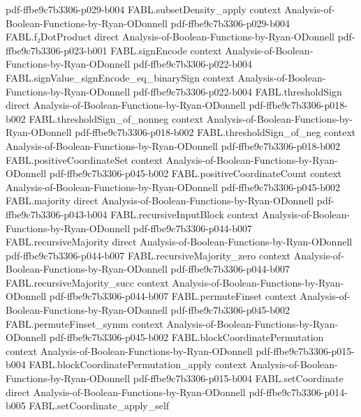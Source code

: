 \begin{theorem}
  {pdf-ffbe9c7b3306-p029-b004}
\proofstep
  {FABL.subsetDensity_apply}
  {context}
  {Analysis-of-Boolean-Functions-by-Ryan-ODonnell}
  {pdf-ffbe9c7b3306-p029-b004}
\proofstep
  {FABL.f₂DotProduct}
  {direct}
  {Analysis-of-Boolean-Functions-by-Ryan-ODonnell}
  {pdf-ffbe9c7b3306-p023-b001}
\proofstep
  {FABL.signEncode}
  {context}
  {Analysis-of-Boolean-Functions-by-Ryan-ODonnell}
  {pdf-ffbe9c7b3306-p022-b004}
\proofstep
  {FABL.signValue_signEncode_eq_binarySign}
  {context}
  {Analysis-of-Boolean-Functions-by-Ryan-ODonnell}
  {pdf-ffbe9c7b3306-p022-b004}
\proofstep
  {FABL.thresholdSign}
  {direct}
  {Analysis-of-Boolean-Functions-by-Ryan-ODonnell}
  {pdf-ffbe9c7b3306-p018-b002}
\proofstep
  {FABL.thresholdSign_of_nonneg}
  {context}
  {Analysis-of-Boolean-Functions-by-Ryan-ODonnell}
  {pdf-ffbe9c7b3306-p018-b002}
\proofstep
  {FABL.thresholdSign_of_neg}
  {context}
  {Analysis-of-Boolean-Functions-by-Ryan-ODonnell}
  {pdf-ffbe9c7b3306-p018-b002}
\proofstep
  {FABL.positiveCoordinateSet}
  {context}
  {Analysis-of-Boolean-Functions-by-Ryan-ODonnell}
  {pdf-ffbe9c7b3306-p045-b002}
\proofstep
  {FABL.positiveCoordinateCount}
  {context}
  {Analysis-of-Boolean-Functions-by-Ryan-ODonnell}
  {pdf-ffbe9c7b3306-p045-b002}
\proofstep
  {FABL.majority}
  {direct}
  {Analysis-of-Boolean-Functions-by-Ryan-ODonnell}
  {pdf-ffbe9c7b3306-p043-b004}
\proofstep
  {FABL.recursiveInputBlock}
  {context}
  {Analysis-of-Boolean-Functions-by-Ryan-ODonnell}
  {pdf-ffbe9c7b3306-p044-b007}
\proofstep
  {FABL.recursiveMajority}
  {direct}
  {Analysis-of-Boolean-Functions-by-Ryan-ODonnell}
  {pdf-ffbe9c7b3306-p044-b007}
\proofstep
  {FABL.recursiveMajority_zero}
  {context}
  {Analysis-of-Boolean-Functions-by-Ryan-ODonnell}
  {pdf-ffbe9c7b3306-p044-b007}
\proofstep
  {FABL.recursiveMajority_succ}
  {context}
  {Analysis-of-Boolean-Functions-by-Ryan-ODonnell}
  {pdf-ffbe9c7b3306-p044-b007}
\proofstep
  {FABL.permuteFinset}
  {context}
  {Analysis-of-Boolean-Functions-by-Ryan-ODonnell}
  {pdf-ffbe9c7b3306-p045-b002}
\proofstep
  {FABL.permuteFinset_symm}
  {context}
  {Analysis-of-Boolean-Functions-by-Ryan-ODonnell}
  {pdf-ffbe9c7b3306-p045-b002}
\proofstep
  {FABL.blockCoordinatePermutation}
  {context}
  {Analysis-of-Boolean-Functions-by-Ryan-ODonnell}
  {pdf-ffbe9c7b3306-p015-b004}
\proofstep
  {FABL.blockCoordinatePermutation_apply}
  {context}
  {Analysis-of-Boolean-Functions-by-Ryan-ODonnell}
  {pdf-ffbe9c7b3306-p015-b004}
\proofstep
  {FABL.setCoordinate}
  {direct}
  {Analysis-of-Boolean-Functions-by-Ryan-ODonnell}
  {pdf-ffbe9c7b3306-p014-b005}
\proofstep
  {FABL.setCoordinate_apply_self}

\end{theorem}
